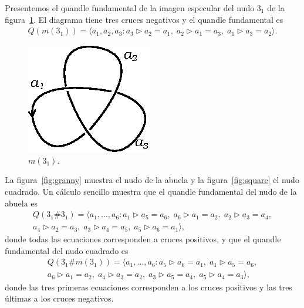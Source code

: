 \documentclass[graybox]{svmult}
\begin{document}
	Presentemos el quandle fundamental de la imagen especular del nudo $3_1$ de
	la figura~\ref{fig:3_1m}. El diagrama tiene tres cruces negativos y el
	quandle fundamental es
	\begin{align*}
		Q(m(3_1))=\langle a_1,a_2,a_3:
		a_3\triangleright a_2=a_1,\;
		a_2\triangleright a_1=a_3,\;
		a_1\triangleright a_3=a_2\rangle.
	\end{align*}

	\begin{figure}[ht]
	    \centering
	    \includegraphics[scale=0.6]{images/3_1m}
		\caption{$m(3_1)$.}
    	\label{fig:3_1m}
	\end{figure}


    La figura~\ref{fig:granny} muestra el nudo de la abuela y la
    figura~\ref{fig:square} el nudo cuadrado.  Un cálculo sencillo muestra que 
    el quandle fundamental del nudo de la abuela es
    \begin{multline*}
		Q(3_1\#3_1)=\langle a_1,\dots,a_6:
        a_1\triangleright a_5=a_6,\;
        a_6\triangleright a_1=a_2,\;
        a_2\triangleright a_3=a_4,\\
		a_4\triangleright a_2=a_3,\;
        a_3\triangleright a_4=a_5,\;
        a_5\triangleright a_6=a_1\rangle,
	\end{multline*}
    donde todas las ecuaciones corresponden a cruces positivos, 
    y que el quandle fundamental del nudo cuadrado es
    \begin{multline}
		Q(3_1\#m(3_1))=\langle a_1,\dots,a_6:
        a_5\triangleright a_6=a_1,\;
		a_1\triangleright a_5=a_6,\\
        a_6\triangleright a_1=a_2,\;
        a_4\triangleright a_3=a_2,\;
		a_3\triangleright a_5=a_4,\;
        a_5\triangleright a_4=a_3\rangle,
    \end{multline}
    donde las tres primeras ecuaciones corresponden a los cruces positivos y
   	las tres últimas a los cruces negativos.
\end{document}
